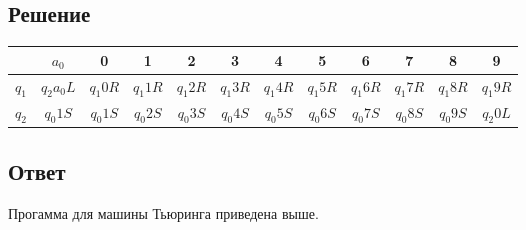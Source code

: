 \documentclass[14pt, a4paper]{article}
\begin{document}
    \subsection*{Решение}
    
    \begin{center}
        \begin{tabular}{ | c | c | c | c | c | c | c | c | c | c | c | c | } 
            \hline
            & $a_0$ & 0 & 1 & 2 & 3 & 4 & 5 & 6 & 7 & 8 & 9 \\
            \hline
            $q_1$ & $q_2 a_0 L$ & $q_1 0 R$ & $q_1 1 R$ & $q_1 2 R$ & $q_1 3 R$ & $q_1 4 R$ & $q_1 5 R$ & $q_1 6 R$ & $q_1 7 R$ & $q_1 8 R$ & $q_1 9 R$ \\
            \hline
            $q_2$ & $q_0 1 S$ & $q_0 1 S$ & $q_0 2 S$ & $q_0 3 S$ & $q_0 4 S$ & $q_0 5 S$ & $q_0 6 S$ & $q_0 7 S$ & $q_0 8 S$ & $q_0 9 S$ & $q_2 0 L$ \\
            \hline
        \end{tabular}
    \end{center}

    \subsection*{Ответ}
    Прогамма для машины Тьюринга приведена выше.
\end{document}
